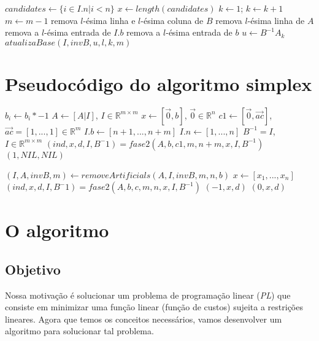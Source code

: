 \documentclass[12pt]{article}
\begin{document}
\begin{algorithmic}
		\State $candidates \gets \{i \in I.n | i< n\}$
		\State $x \gets length(candidates)$
		\State $k \gets 1$;
			\State $k \gets k + 1$
		\EndWhile
			\State $m \gets m - 1$
			\State remova $l$-ésima linha e $l$-ésima coluna de $B$
			\State remova $l$-ésima linha de $A$
			\State remova a $l$-ésima entrada de $I.b$
			\State remova a $l$-ésima entrada de $b$
		\Else
			\State $u \gets B^{-1}A_k$ 
			\State $atualizaBase(I, invB, u, l, k, m)$
		\EndIf 
	\EndFor
\EndFunction
\end{algorithmic}
	
\section{Pseudocódigo do algoritmo simplex}
\begin{algorithmic}
		\State $b_i \gets b_i * -1$
	\EndFor
	\State $A \gets [A | I]$, $I \in \mathbb{R}^{m \times m}$
	\State $x \gets [\vec{0}, b]$, $\vec{0} \in \mathbb{R}^{n}$
	\State $c1 \gets [\vec{0}, \vec{ac}]$, $\vec{ac} = [1, ..., 1] \in \mathbb{R}^m$
	\State $I.b \gets [n + 1, ..., n + m]$
	\State $I.n \gets [1, ..., n]$
	\State $B^{-1} = I$, $I \in \mathbb{R}^{m \times m}$
	\State $(ind, x, d, I, B^-1) = fase2(A, b, c1, m, n + m, x, I, B^{-1})$
		\Return $(1, NIL, NIL)$
	
	\EndIf
	\State $(I, A, invB, m) \gets removeArtificials (A, I, invB, m, n, b)$
	\State $x \gets [x_1, ..., x_n]$
	\State $(ind, x, d, I, B^-1) = fase2(A, b, c, m, n, x, I, B^{-1})$
		\Return $(-1, x, d)$
	\Else
		\Return $(0, x, d)$
	\EndIf
\EndFunction
\end{algorithmic}

\section{O algoritmo}

\subsection{Objetivo}
	Nossa motivação é solucionar um problema de programação linear (\emph{PL}) que consiste em minimizar uma função linear (função de custos) sujeita a restrições lineares. Agora que temos os conceitos necessários, vamos desenvolver um algoritmo para solucionar tal problema.
\end{document}

